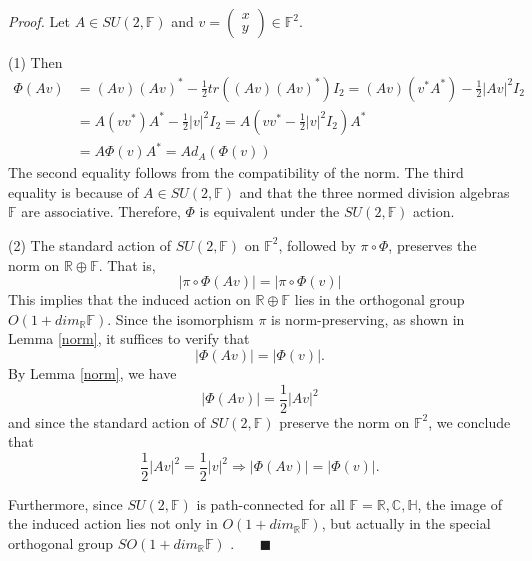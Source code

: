 \documentclass[a4paper]{article}%
\newenvironment{proof}[1][Proof]{\noindent\textit{#1.} }{}
\begin{document}
\begin{proof}
Let $A\in SU(2,\mathbb{F})$ and $v=%
\begin{pmatrix}
x\\
y
\end{pmatrix}
\in\mathbb{F}^{2}$.

(1) Then
\begin{align*}
\Phi\left(  Av\right)   &  =\left(  Av\right)  \left(  Av\right)  ^{\ast
}-\frac{1}{2}tr\left(  \left(  Av\right)  \left(  Av\right)  ^{\ast}\right)
I_{2}=\left(  Av\right)  \left(  v^{\ast}A^{\ast}\right)  -\frac{1}%
{2}\left\vert Av\right\vert ^{2}I_{2}\\
&  =A\left(  vv^{\ast}\right)  A^{\ast}-\frac{1}{2}\left\vert v\right\vert
^{2}I_{2}=A\left(  vv^{\ast}-\frac{1}{2}\left\vert v\right\vert ^{2}%
I_{2}\right)  A^{\ast}\\
&  =A\Phi\left(  v\right)  A^{\ast}=Ad_{A}\left(  \Phi\left(  v\right)
\right)
\end{align*}
The second equality follows from the compatibility of the norm. The third
equality is because of $A\in SU(2,\mathbb{F})$ and that the three normed
division algebras $\mathbb{F}$ are associative. Therefore, $\Phi$ is
equivalent under the $SU(2,\mathbb{F})$ action.

(2) The standard action of $SU(2,\mathbb{F})$ on $\mathbb{F}^{2}$, followed by
$\pi\circ\Phi$, preserves the norm on $\mathbb{R}\oplus\mathbb{F}$. That is,
\[
\left\vert \pi\circ\Phi\left(  Av\right)  \right\vert =\left\vert \pi\circ
\Phi\left(  v\right)  \right\vert
\]
This implies that the induced action on $\mathbb{R}\oplus\mathbb{F}$ lies in
the orthogonal group $O(1+dim_{\mathbb{R}}\mathbb{F})$. Since the isomorphism
$\pi$ is norm-preserving, as shown in Lemma \ref{norm}, it suffices to verify
that
\[
\left\vert \Phi\left(  Av\right)  \right\vert =\left\vert \Phi\left(
v\right)  \right\vert .
\]
By Lemma \ref{norm}, we have
\[
\left\vert \Phi\left(  Av\right)  \right\vert =\frac{1}{2}\left\vert
Av\right\vert ^{2}%
\]
and since the standard action of $SU(2,\mathbb{F})$ preserve the norm on
$\mathbb{F}^{2}$, we conclude that
\[
\frac{1}{2}\left\vert Av\right\vert ^{2}=\frac{1}{2}\left\vert v\right\vert
^{2}\Rightarrow\left\vert \Phi\left(  Av\right)  \right\vert =\left\vert
\Phi\left(  v\right)  \right\vert .
\]


Furthermore, since $SU(2,\mathbb{F})$ is path-connected for all $\mathbb{F}%
=\mathbb{R},\mathbb{C},\mathbb{H}$, the image of the induced action lies not
only in $O(1+dim_{\mathbb{R}}\mathbb{F})$, but actually in the special
orthogonal group $SO(1+dim_{\mathbb{R}}\mathbb{F})$%
.\ $\ \ \ \ \ \ \blacksquare$
\end{proof}
\end{document}
